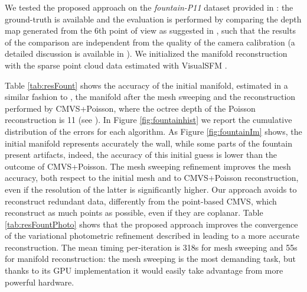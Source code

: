 

We tested the proposed approach on the \emph{fountain-P11} dataset provided in \cite{strecha2008}: the ground-truth is available and the evaluation is performed by comparing the depth map generated from the 6th point of view as suggested in  \cite{strecha2008}, such that the results of the comparison are independent from the quality of the camera calibration (a detailed discussion is available in \cite{strecha2008}). We initialized the manifold reconstruction with the sparse point cloud data estimated with VisualSFM \cite{wu2011visualsfm}. 


Table \ref{tab:resFount} shows the accuracy of the initial manifold, estimated in a similar fashion to \cite{romanoni15b}, the manifold after the mesh sweeping and the reconstruction performed by CMVS+Poisson, where the octree depth of the Poisson reconstruction is 11 (see \cite{kazhdan2006poisson}). In Figure \ref{fig:fountainhist} we report the cumulative distribution of the errors for each algorithm.
As Figure \ref{fig:fountainIm} shows, the initial manifold represents accurately the wall, while some parts of the fountain present artifacts, indeed, the accuracy of this initial guess is lower than the outcome of CMVS+Poisson.
The mesh sweeping refinement improves the mesh accuracy, both respect to the initial mesh and to CMVS+Poisson reconstruction, even if the resolution of the latter is significantly higher. Our approach avoids to reconstruct redundant data, differently from the point-based CMVS, which reconstruct as much points as possible, even if they are coplanar.
Table \ref{tab:resFountPhoto} shows that the proposed approach improves the convergence of the variational photometric refinement described in \cite{vu_et_al_2012} leading to a more accurate reconstruction. 
The mean timing per-iteration is 318s for mesh sweeping and 55s for manifold reconstruction: the mesh sweeping is the most demanding task, but thanks to its GPU implementation it would easily take advantage from more powerful hardware.

